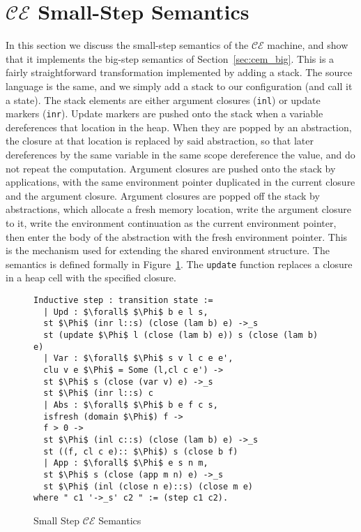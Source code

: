 \section{$\mathcal{CE}$ Small-Step Semantics} \label{sec:cem_small}

In this section we discuss the small-step semantics of the $\mathcal{CE}$
machine, and show that it implements the big-step semantics of
Section~\ref{sec:cem_big}. This is a fairly straightforward transformation implemented
by adding a stack. The source language is the same, and we simply add a stack to
our configuration (and call it a state). The stack elements are either argument
closures (\texttt{inl}) or update markers (\texttt{inr}). Update markers
are pushed onto the stack when a variable dereferences that location in the
heap. When they are popped by an abstraction, the closure at that location is
replaced by said abstraction, so that later dereferences by the same variable in
the same scope dereference the value, and do not repeat the computation.
Argument closures are pushed onto the stack by applications, with the same
environment pointer duplicated in the current closure and the argument closure.
Argument closures are popped off the stack by abstractions, which allocate a
fresh memory location, write the argument closure to it, write the environment
continuation as the current environment pointer, then enter the body of the
abstraction with the fresh environment pointer. This is the mechanism used for
extending the shared environment structure. The semantics is defined formally in
Figure~\ref{fig:cesm}. The \texttt{update} function replaces a closure in a heap
cell with the specified closure.  

\begin{figure}
\begin{lstlisting}
Inductive step : transition state :=
  | Upd : $\forall$ $\Phi$ b e l s, 
  st $\Phi$ (inr l::s) (close (lam b) e) ->_s 
  st (update $\Phi$ l (close (lam b) e)) s (close (lam b) e)
  | Var : $\forall$ $\Phi$ s v l c e e', 
  clu v e $\Phi$ = Some (l,cl c e') -> 
  st $\Phi$ s (close (var v) e) ->_s 
  st $\Phi$ (inr l::s) c
  | Abs : $\forall$ $\Phi$ b e f c s, 
  isfresh (domain $\Phi$) f -> 
  f > 0 -> 
  st $\Phi$ (inl c::s) (close (lam b) e) ->_s 
  st ((f, cl c e):: $\Phi$) s (close b f)
  | App : $\forall$ $\Phi$ e s n m, 
  st $\Phi$ s (close (app m n) e) ->_s 
  st $\Phi$ (inl (close n e)::s) (close m e)
where " c1 '->_s' c2 " := (step c1 c2).
\end{lstlisting}
\caption{Small Step $\mathcal{CE}$ Semantics}
\label{fig:cesm}
\end{figure}

